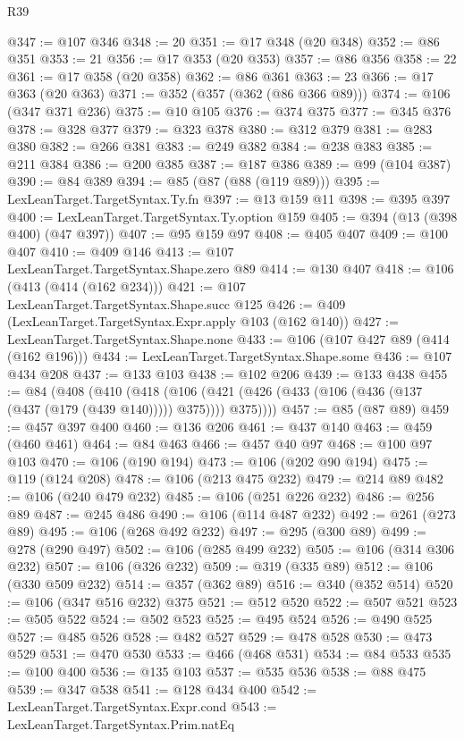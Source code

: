 \begin{lexlean}{R39}
\begin{coremodule}
@347 := @107 @346
@348 := 20
@351 := @17 @348 (@20 @348)
@352 := @86 @351
@353 := 21
@356 := @17 @353 (@20 @353)
@357 := @86 @356
@358 := 22
@361 := @17 @358 (@20 @358)
@362 := @86 @361
@363 := 23
@366 := @17 @363 (@20 @363)
@371 := @352 (@357 (@362 (@86 @366 @89)))
@374 := @106 (@347 @371 @236)
@375 := @10 @105
@376 := @374 @375
@377 := @345 @376
@378 := @328 @377
@379 := @323 @378
@380 := @312 @379
@381 := @283 @380
@382 := @266 @381
@383 := @249 @382
@384 := @238 @383
@385 := @211 @384
@386 := @200 @385
@387 := @187 @386
@389 := @99 (@104 @387)
@390 := @84 @389
@394 := @85 (@87 (@88 (@119 @89)))
@395 := LexLeanTarget.TargetSyntax.Ty.fn
@397 := @13 @159 @11
@398 := @395 @397
@400 := LexLeanTarget.TargetSyntax.Ty.option @159
@405 := @394 (@13 (@398 @400) (@47 @397))
@407 := @95 @159 @97
@408 := @405 @407
@409 := @100 @407
@410 := @409 @146
@413 := @107 LexLeanTarget.TargetSyntax.Shape.zero @89
@414 := @130 @407
@418 := @106 (@413 (@414 (@162 @234)))
@421 := @107 LexLeanTarget.TargetSyntax.Shape.succ @125
@426 := @409 (LexLeanTarget.TargetSyntax.Expr.apply @103 (@162 @140))
@427 := LexLeanTarget.TargetSyntax.Shape.none
@433 := @106 (@107 @427 @89 (@414 (@162 @196)))
@434 := LexLeanTarget.TargetSyntax.Shape.some
@436 := @107 @434 @208
@437 := @133 @103
@438 := @102 @206
@439 := @133 @438
@455 := @84
    (@408
      (@410
        (@418
          (@106 (@421 (@426 (@433 (@106 (@436 (@137 (@437 (@179 (@439 @140))))) @375)))) @375))))
@457 := @85 (@87 @89)
@459 := @457 @397 @400
@460 := @136 @206
@461 := @437 @140
@463 := @459 (@460 @461)
@464 := @84 @463
@466 := @457 @40 @97
@468 := @100 @97 @103
@470 := @106 (@190 @194)
@473 := @106 (@202 @90 @194)
@475 := @119 (@124 @208)
@478 := @106 (@213 @475 @232)
@479 := @214 @89
@482 := @106 (@240 @479 @232)
@485 := @106 (@251 @226 @232)
@486 := @256 @89
@487 := @245 @486
@490 := @106 (@114 @487 @232)
@492 := @261 (@273 @89)
@495 := @106 (@268 @492 @232)
@497 := @295 (@300 @89)
@499 := @278 (@290 @497)
@502 := @106 (@285 @499 @232)
@505 := @106 (@314 @306 @232)
@507 := @106 (@326 @232)
@509 := @319 (@335 @89)
@512 := @106 (@330 @509 @232)
@514 := @357 (@362 @89)
@516 := @340 (@352 @514)
@520 := @106 (@347 @516 @232) @375
@521 := @512 @520
@522 := @507 @521
@523 := @505 @522
@524 := @502 @523
@525 := @495 @524
@526 := @490 @525
@527 := @485 @526
@528 := @482 @527
@529 := @478 @528
@530 := @473 @529
@531 := @470 @530
@533 := @466 (@468 @531)
@534 := @84 @533
@535 := @100 @400
@536 := @135 @103
@537 := @535 @536
@538 := @88 @475
@539 := @347 @538
@541 := @128 @434 @400
@542 := LexLeanTarget.TargetSyntax.Expr.cond
@543 := LexLeanTarget.TargetSyntax.Prim.natEq

\end{coremodule}
\end{lexlean}

